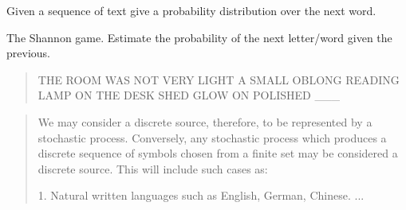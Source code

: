 \documentclass{beamer}
\newcommand{\air}{\vspace{0.25cm}}
\begin{document}
\begin{frame}
  \begin{center}
  \end{center}
  Given a sequence of text give a probability distribution 
  over the next word. 

\air

  The Shannon game. Estimate the probability of the next letter/word
  given the previous.

  \begin{quote}
    THE ROOM WAS NOT VERY LIGHT A SMALL OBLONG READING LAMP ON THE
    DESK SHED GLOW ON POLISHED \_\_\_\
  \end{quote}


\end{frame}


\begin{frame}
  \begin{center}
  \end{center}
\air
  
\begin{quote}  
  We may consider a discrete source, therefore,
to be represented by a stochastic process. Conversely, any stochastic
process which produces a discrete sequence of symbols chosen from a finite
set may be considered a discrete source. This will include such cases as:

1. Natural written languages such as English, German, Chinese.
...
\end{quote}
\end{frame}
\end{document}
